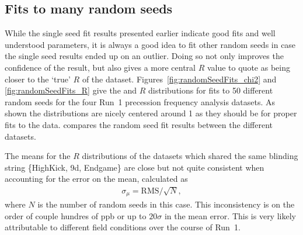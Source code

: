 \subsection{Fits to many random seeds}
\label{sub:randomSeedFits}


While the single seed fit results presented earlier indicate good fits and well understood parameters, it is always a good idea to fit other random seeds in case the single seed results ended up on an outlier. Doing so not only improves the confidence of the result, but also gives a more central $R$ value to quote as being closer to the `true' $R$ of the dataset. Figures~\ref{fig:randomSeedFits_chi2} and \ref{fig:randomSeedFits_R} give the \chisq and $R$ distributions for fits to 50 different random seeds for the four Run~1 precession frequency analysis datasets. As shown the \chisq distributions are nicely centered around 1 as they should be for proper fits to the data.  compares the random seed fit results between the different datasets.

The means for the $R$ distributions of the datasets which shared the same blinding string \{HighKick, 9d, Endgame\} are close but not quite consistent when accounting for the error on the mean, calculated as
  \begin{align}
    \sigma_{\mu} = \text{RMS}/\sqrt{N},
  \end{align}
where $N$ is the number of random seeds in this case. This inconsistency is on the order of couple hundres of ppb or up to $20\sigma$ in the mean error. This is very likely attributable to different field conditions over the course of Run~1.



